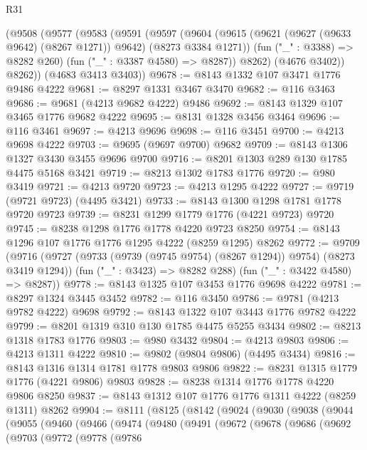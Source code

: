 \begin{lexlean}{R31}
\begin{coremodule}
    (@9508
      (@9577
        (@9583
          (@9591
            (@9597
              (@9604
                (@9615 (@9621 (@9627 (@9633 @9642) (@8267 @1271)) @9642) (@8273 @3384 @1271))
                (fun ("_" : @3388) => @8282 @260)
                (fun ("_" : @3387 @4580) => @8287))
              @8262)
            (@4676 @3402))
          @8262))
      (@4683 @3413 @3403))
@9678 := @8143 @1332 @107 @3471 @1776 @9486 @4222
@9681 := @8297 @1331 @3467 @3470
@9682 := @116 @3463
@9686 := @9681 (@4213 @9682 @4222) @9486
@9692 := @8143 @1329 @107 @3465 @1776 @9682 @4222
@9695 := @8131 @1328 @3456 @3464
@9696 := @116 @3461
@9697 := @4213 @9696
@9698 := @116 @3451
@9700 := @4213 @9698 @4222
@9703 := @9695 (@9697 @9700) @9682
@9709 := @8143 @1306 @1327 @3430 @3455 @9696 @9700
@9716 := @8201 @1303 @289 @130 @1785 @4475 @5168 @3421
@9719 := @8213 @1302 @1783 @1776
@9720 := @980 @3419
@9721 := @4213 @9720
@9723 := @4213 @1295 @4222
@9727 := @9719 (@9721 @9723) (@4495 @3421)
@9733 := @8143 @1300 @1298 @1781 @1778 @9720 @9723
@9739 := @8231 @1299 @1779 @1776 (@4221 @9723) @9720
@9745 := @8238 @1298 @1776 @1778 @4220 @9723 @8250
@9754 := @8143 @1296 @107 @1776 @1776 @1295 @4222 (@8259 @1295) @8262
@9772 := @9709
    (@9716
      (@9727 (@9733 (@9739 (@9745 @9754) (@8267 @1294)) @9754) (@8273 @3419 @1294))
      (fun ("_" : @3423) => @8282 @288)
      (fun ("_" : @3422 @4580) => @8287))
@9778 := @8143 @1325 @107 @3453 @1776 @9698 @4222
@9781 := @8297 @1324 @3445 @3452
@9782 := @116 @3450
@9786 := @9781 (@4213 @9782 @4222) @9698
@9792 := @8143 @1322 @107 @3443 @1776 @9782 @4222
@9799 := @8201 @1319 @310 @130 @1785 @4475 @5255 @3434
@9802 := @8213 @1318 @1783 @1776
@9803 := @980 @3432
@9804 := @4213 @9803
@9806 := @4213 @1311 @4222
@9810 := @9802 (@9804 @9806) (@4495 @3434)
@9816 := @8143 @1316 @1314 @1781 @1778 @9803 @9806
@9822 := @8231 @1315 @1779 @1776 (@4221 @9806) @9803
@9828 := @8238 @1314 @1776 @1778 @4220 @9806 @8250
@9837 := @8143 @1312 @107 @1776 @1776 @1311 @4222 (@8259 @1311) @8262
@9904 := @8111
    (@8125
      (@8142
        (@9024
          (@9030
            (@9038
              (@9044
                (@9055
                  (@9460
                    (@9466
                      (@9474
                        (@9480
                          (@9491
                            (@9672
                              (@9678
                                (@9686
                                  (@9692
                                    (@9703
                                      (@9772
                                        (@9778
                                          (@9786

\end{coremodule}
\end{lexlean}
